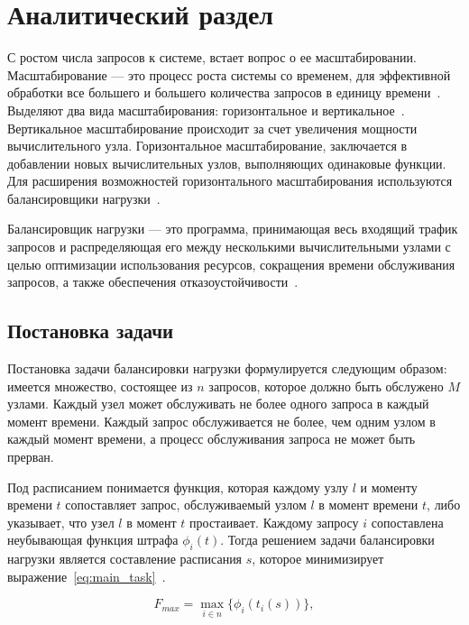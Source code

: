 

\chapter{Аналитический раздел}

С ростом числа запросов к системе, встает вопрос о ее масштабировании. 
Масштабирование --- это процесс роста системы со временем, для эффективной обработки все большего и большего количества запросов в единицу времени~\cite{scaling}. 
Выделяют два вида масштабирования: горизонтальное и вертикальное~\mbox{\cite{comp, part_algos, com_analysis}}.
Вертикальное масштабирование происходит за счет увеличения мощности вычислительного узла.  
Горизонтальное масштабирование, заключается в добавлении новых вычислительных узлов, выполняющих одинаковые функции.
Для расширения возможностей горизонтального масштабирования используются балансировщики нагрузки~\cite{part_algos, comp}.

Балансировщик нагрузки --- это программа, принимающая весь
входящий трафик запросов и распределяющая его между несколькими
вычислительными узлами с целью оптимизации использования
ресурсов, сокращения времени обслуживания запросов, а также
обеспечения отказоустойчивости~\cite{comp}.


\section{Постановка задачи}

Постановка задачи балансировки нагрузки формулируется следующим образом: имеется множество, состоящее из $n$ запросов, которое должно быть обслужено $M$ узлами. 
Каждый узел может обслуживать не более одного запроса в каждый момент времени.
Каждый запрос обслуживается не более, чем одним узлом в каждый момент времени, а процесс обслуживания запроса не может быть прерван. 

Под расписанием понимается функция, которая каждому узлу $l$ и моменту времени $t$ сопоставляет запрос, обслуживаемый узлом $l$ в момент времени $t$, либо указывает, что узел $l$ в момент $t$ простаивает.
Каждому запросу $i$ сопоставлена неубывающая функция штрафа $\phi_i(t)$.
Тогда решением задачи балансировки нагрузки является составление расписания $s$, которое минимизирует выражение~\eqref{eq:main_task}~\cite{gaud}.

\begin{equation}
	\label{eq:main_task}	
	F_{max} =   \max_{i \in n} \{\phi_i(t_i(s))\}, 
\end{equation}

